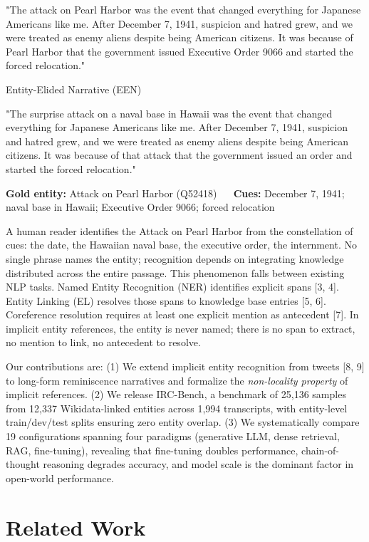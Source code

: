 ﻿\documentclass{article}
\begin{document}
"The attack on Pearl Harbor was the event that changed everything for
Japanese Americans like me. After December 7, 1941, suspicion and hatred
grew, and we were treated as enemy aliens despite being American
citizens. It was because of Pearl Harbor that the government issued
Executive Order 9066 and started the forced relocation."

Entity-Elided Narrative (EEN)

"The surprise attack on a naval base in Hawaii was the event that
changed everything for Japanese Americans like me. After December 7,
1941, suspicion and hatred grew, and we were treated as enemy aliens
despite being American citizens. It was because of that attack that the
government issued an order and started the forced relocation."

\textbf{Gold entity:} Attack on Pearl Harbor (Q52418) ~\textbar~
\textbf{Cues:} December 7, 1941; naval base in Hawaii; Executive Order
9066; forced relocation

A human reader identifies the Attack on Pearl Harbor from the
constellation of cues: the date, the Hawaiian naval base, the executive
order, the internment. No single phrase names the entity; recognition
depends on integrating knowledge distributed across the entire passage.
This phenomenon falls between existing NLP tasks. Named Entity
Recognition (NER) identifies explicit spans {[}3, 4{]}. Entity Linking
(EL) resolves those spans to knowledge base entries {[}5, 6{]}.
Coreference resolution requires at least one explicit mention as
antecedent {[}7{]}. In implicit entity references, the entity is never
named; there is no span to extract, no mention to link, no antecedent to
resolve.

Our contributions are: (1) We extend implicit entity recognition from
tweets {[}8, 9{]} to long-form reminiscence narratives and formalize the
\emph{non-locality property} of implicit references. (2) We release
IRC-Bench, a benchmark of 25,136 samples from 12,337 Wikidata-linked
entities across 1,994 transcripts, with entity-level train/dev/test
splits ensuring zero entity overlap. (3) We systematically compare 19
configurations spanning four paradigms (generative LLM, dense retrieval,
RAG, fine-tuning), revealing that fine-tuning doubles performance,
chain-of-thought reasoning degrades accuracy, and model scale is the
dominant factor in open-world performance.

\section{Related Work}\label{related-work}
\end{document}

